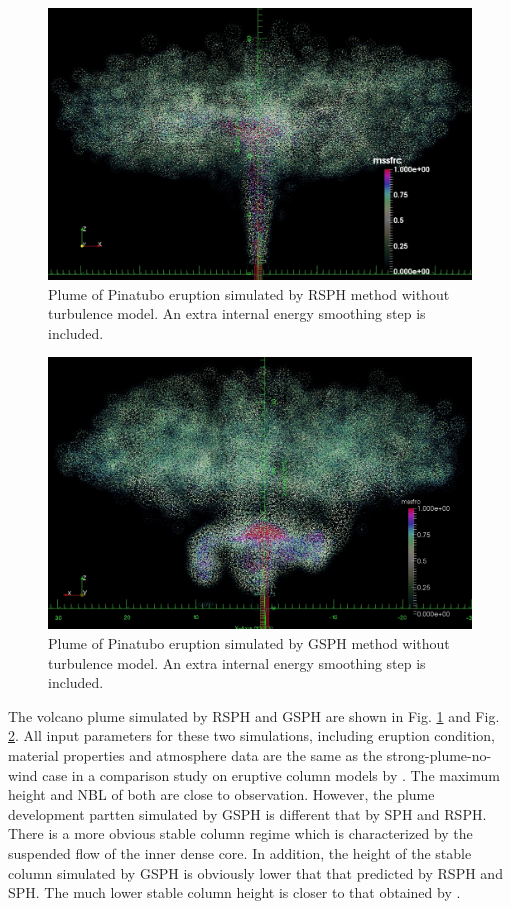 \begin{figure}
\center
\includegraphics[width=0.75 \textwidth]{Chapter-6/Figures/RSPH_mssfrc_420s}
\caption{Plume of Pinatubo eruption simulated by RSPH method without turbulence model. An extra internal energy smoothing step is included.}
\label{fig:Pinatubo-RSPH}
\end{figure}

\begin{figure}
\center
\includegraphics[width=0.75 \textwidth]{Chapter-6/Figures/GSPH_mssfrc_640s}
\caption{Plume of Pinatubo eruption simulated by GSPH method without turbulence model. An extra internal energy smoothing step is included.}
\label{fig:Pinatubo-GSPH}
\end{figure}

The volcano plume simulated by RSPH and GSPH are shown in Fig. \ref{fig:Pinatubo-RSPH} and Fig. \ref{fig:Pinatubo-GSPH}. 
All input parameters for these two simulations, including eruption condition, material properties and atmosphere data are the same as the strong-plume-no-wind case in a comparison study on eruptive column models by \citet{costa2016results}.
The maximum height and NBL of both are close to observation. However, the plume development partten simulated by GSPH is different that by SPH and RSPH. There is a more obvious stable column regime which is characterized by the suspended flow of the inner dense core. In addition, the height of the stable column simulated by GSPH is obviously lower that that predicted by RSPH and SPH. The much lower stable column height is closer to that obtained by \citet{suzuki2005numerical}.

